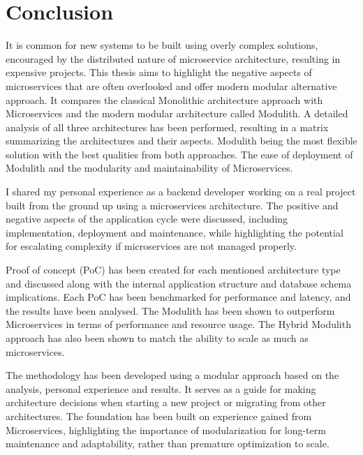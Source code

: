 

\chapter{Conclusion}
It is common for new systems to be built using overly complex solutions, encouraged by the distributed nature of microservice architecture, resulting in expensive projects. This thesis aims to highlight the negative aspects of microservices that are often overlooked and offer modern modular alternative approach. It compares the classical Monolithic architecture approach with Microservices and the modern modular architecture called Modulith. A detailed analysis of all three architectures has been performed, resulting in a matrix summarizing the architectures and their aspects. Modulith being the most flexible solution with the best qualities from both approaches. The ease of deployment of Modulith and the modularity and maintainability of Microservices.

I shared my personal experience as a backend developer working on a real project built from the ground up using a microservices architecture. The positive and negative aspects of the application cycle were discussed, including implementation, deployment and maintenance, while highlighting the potential for escalating complexity if microservices are not managed properly.

Proof of concept (PoC) has been created for each mentioned architecture type and discussed along with the internal application structure and database schema implications. Each PoC has been benchmarked for performance and latency, and the results have been analysed. The Modulith has been shown to outperform Microservices in terms of performance and resource usage. The Hybrid Modulith approach has also been shown to match the ability to scale as much as microservices.

The methodology has been developed using a modular approach based on the analysis, personal experience and results. It serves as a guide for making architecture decisions when starting a new project or migrating from other architectures. The foundation has been built on experience gained from Microservices, highlighting the importance of modularization for long-term maintenance and adaptability, rather than premature optimization to scale. 


